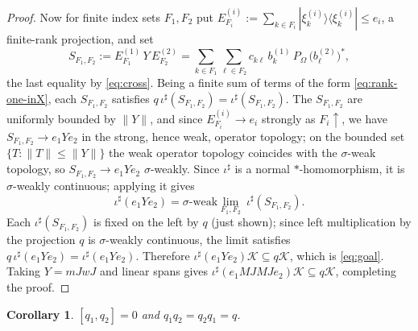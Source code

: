 \documentclass[a4paper, 11pt, reqno]{amsart}
\numberwithin{equation}{section}
\theoremstyle{plain}
\newtheorem{corollary}[thm]{Corollary}
\theoremstyle{remark}
\theoremstyle{definition}
\newcommand{\KK}{{\mathcal K}}
\begin{document}
\begin{proof}
Now for finite index sets $F_1,F_2$ put $E^{(i)}_{F_i}:=\sum_{k\in F_i}|\xi^{(i)}_k\rangle\langle\xi^{(i)}_k|\le e_i$, a finite-rank projection, and set
\[
S_{F_1,F_2}:=E^{(1)}_{F_1}\,Y\,E^{(2)}_{F_2}=\sum_{k\in F_1}\sum_{\ell\in F_2}c_{k\ell}\,b^{(1)}_k\,P_\Omega\,\big(b^{(2)}_\ell\big)^* ,
\]
the last equality by \eqref{eq:cross}. Being a finite sum of terms of the form \eqref{eq:rank-one-inX}, each $S_{F_1,F_2}$ satisfies $q\,\iota^\sharp(S_{F_1,F_2})=\iota^\sharp(S_{F_1,F_2})$. The $S_{F_1,F_2}$ are uniformly bounded by $\|Y\|$, and since $E^{(i)}_{F_i}\to e_i$ strongly as $F_i\uparrow$, we have $S_{F_1,F_2}\to e_1Ye_2$ in the strong, hence weak, operator topology; on the bounded set $\{T:\|T\|\le\|Y\|\}$ the weak operator topology coincides with the $\sigma$-weak topology, so $S_{F_1,F_2}\to e_1Ye_2$ $\sigma$-weakly. Since $\iota^\sharp$ is a normal $*$-homomorphism, it is $\sigma$-weakly continuous; applying it gives
\[
\iota^\sharp(e_1Ye_2)=\sigma\text{-weak}\lim_{F_1,F_2}\ \iota^\sharp(S_{F_1,F_2}).
\]
Each $\iota^\sharp(S_{F_1,F_2})$ is fixed on the left by $q$ (just shown); since left multiplication by the projection $q$ is $\sigma$-weakly continuous, the limit satisfies $q\,\iota^\sharp(e_1Ye_2)=\iota^\sharp(e_1Ye_2)$. Therefore $\iota^\sharp(e_1Ye_2)\KK\subseteq q\KK$, which is \eqref{eq:goal}. Taking $Y=mJwJ$ and linear spans gives $\iota^\sharp(e_1MJMJe_2)\KK\subseteq q\KK$, completing the proof.
\end{proof}

\begin{corollary}\label{cor:commute}
$[q_1,q_2]=0$ and $q_1q_2=q_2q_1=q$.
\end{corollary}
\end{document}
